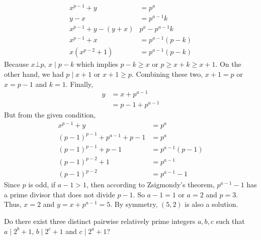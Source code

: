 \begin{solution}
		\begin{align*}
			x^{p-1}+y & = p^a\\
			y-x & = p^{a-1}k\\
			x^{p-1}+y-(y+x) & p^a-p^{a-1}k\\
			x^{p-1}+x & = p^{a-1}(p-k)\\
			x(x^{p-2}+1) & = p^{a-1}(p-k)
		\end{align*}
	Because $x\bot p$, $x\mid p-k$ which implies $p-k\geq x$ or $p\geq x+k\geq x+1$. On the other hand, we had $p\mid x+1$ or $x+1\geq p$. Combining these two, $x+1=p$ or $x=p-1$ and $k=1$. Finally,
		\begin{align*}
			y & = x+p^{a-1}\\
	  & = p-1+p^{a-1}
		\end{align*}
	But from the given condition,
		\begin{align*}
			x^{p-1}+y & = p^a\\
			(p-1)^{p-1}+p^{a-1}+p-1 & = p^a\\
			(p-1)^{p-1}+p-1 & = p^{a-1}(p-1)\\
			(p-1)^{p-2}+1 & = p^{a-1}\\
			(p-1)^{p-2} & = p^{a-1}-1
		\end{align*}
	Since $p$ is odd, if $a-1>1$, then according to Zsigmondy's theorem, $p^{a-1}-1$ has a prime divisor that does not divide $p-1$. So $a-1=1$ or $a=2$ and $p=3$. Thus, $x=2$ and $y=x+p^{a-1}=5$. By symmetry, $(5,2)$ is also a solution.
\end{solution}

\begin{problem}[Russia $2000$]
	Do there exist three distinct pairwise relatively prime integers $a,b,c$ such that $a\mid 2^b+1$, $b\mid 2^c+1$ and $c\mid 2^a+1$?
\end{problem}

